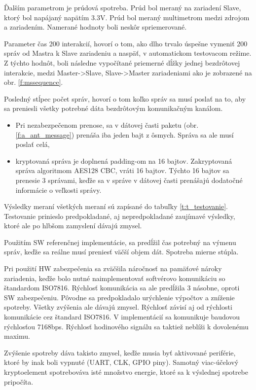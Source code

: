 \documentclass[12pt,a4wide,oneside,openright]{report}
\begin{document}
Ďalším parametrom je prúdová spotreba. Prúd bol meraný na zariadení Slave, ktorý bol napájaný napätím 3.3V. Prúd bol meraný multimetrom medzi zdrojom a zariadením. Namerané hodnoty  boli neskôr spriemerované.

Parameter čas 200 interakcií, hovorí o tom, ako dlho trvalo úspešne vymeniť 200 správ od Mastra k Slave zariadeniu a naspäť, v automatickom testovacom režime. Z týchto hodnôt, boli následne vypočítané priemerné dĺžky jednej bezdrôtovej interakcie, medzi Master-\textgreater Slave, Slave-\textgreater Master zariadeniami ako je zobrazené na obr. \ref{f:mssequence}.

Posledný stĺpec počet správ, hovorí o tom koľko správ sa musí poslať na to, aby sa preniesli všetky potrebné dáta bezdrôtovým komunikačným kanálom. 
\singlespacing
\begin{itemize}
	\item Pri nezabezpečenom prenose, sa v dátovej časti paketu (obr. \ref{f:a_ant_message}) prenáša iba jeden bajt z ôsmych. Správa sa ale musí poslať celá,
	\item kryptovaná správa je doplnená padding-om na 16 bajtov. Zakryptovaná správa algoritmom AES128 CBC, vráti 16 bajtov. Týchto 16 bajtov sa prenesie 3 správami, keďže sa v správe v dátovej časti prenášajú dodatočné informácie o veľkosti správy.
\end{itemize}
\onehalfspacing

Výsledky meraní všetkých meraní sú zapísané do tabuľky \ref{t:t_testovanie}. Testovanie prinieslo predpokladané, aj nepredpokladané zaujímavé výsledky, ktoré ale po hlbšom zamyslení dávajú zmysel.

Použitím SW referenčnej implementácie, sa predĺžil čas potrebný na výmenu správ, keďže sa reálne musí preniesť väčší objem dát. Spotreba mierne stúpla.

Pri použití HW zabezpečenia sa zväčšila náročnosť na pamäťové nároky zariadenia, keďže bolo nutné naimplementovať softvérovo komunikáciu so štandardom ISO7816.
Rýchlosť komunikácia sa ale predĺžila 3 násobne, oproti SW zabezpečeniu. Pôvodne sa predpokladalo urýchlenie výpočtov a zníženie spotreby. Všetky zvýšenia ale dávajú zmysel. Rýchlosť závisí aj od rýchlosti komunikácie cez štandard ISO7816. V implementácií sa komunikuje baudovou rýchlosťou 7168bps. Rýchlosť hodinového signálu sa taktiež neblíži k dovolenému maximu.

Zvýšenie spotreby dáva takisto zmysel, keďže musia byť aktivované periférie, ktoré by inak boli vypnuté (UART, CLK, GPIO piny). Samotný viac-účelový kryptoelement spotrebováva isté množstvo energie, ktoré sa k výslednej spotrebe pripočíta.
\end{document}
